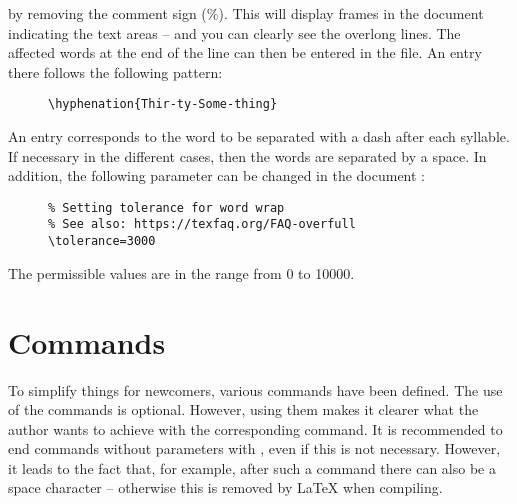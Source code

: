 by removing the comment sign (\%). This will display frames in the document
indicating the text areas -- and you can clearly see the overlong lines. The
affected words at the end of the line can then be entered in the
 file. An entry there follows the
following pattern:

\begin{figure}[H]
    \small
    \centering
    \begin{BVerbatim}
\hyphenation{Thir-ty-Some-thing}
    \end{BVerbatim}
\end{figure}

An entry corresponds to the word to be separated with a dash after each
syllable. If necessary in the different cases, then the words are separated
by a space. In addition, the following parameter can be changed in the document
:

\begin{figure}[H]
    \small
    \centering
    \begin{BVerbatim}
\tolerance=3000
    \end{BVerbatim}
\end{figure}

The permissible values are in the range from 0 to 10000.

\section{Commands}
\label{sec:Commands}

To simplify things for newcomers, various commands have been defined. The use
of the commands is optional. However, using them makes it clearer what the
author wants to achieve with the corresponding command. It is recommended to
end commands without parameters with \tsTextMonospace{\{\}}, even if this is
not necessary. However, it leads to the fact that, for example, after such a
command there can also be a space character -- otherwise this is removed by
\LaTeX{} when compiling.

